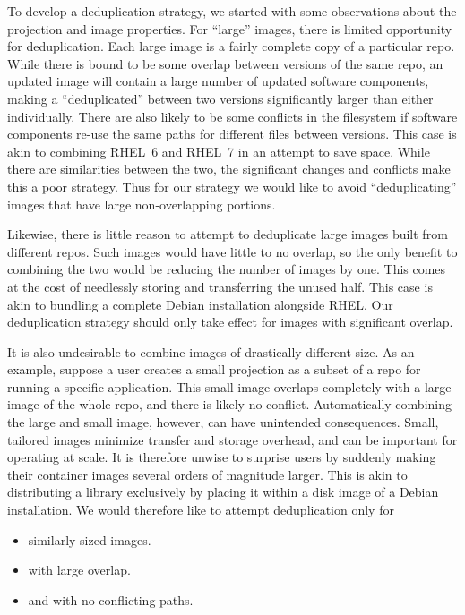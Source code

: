 \documentclass[sigconf]{acmart}
\begin{document}
To develop a deduplication strategy,
we started with some observations about the projection and image properties.
For ``large'' images,
there is limited opportunity for deduplication.
Each large image is a fairly complete copy of a particular repo.
While there is bound to be some overlap between versions of the same repo,
an updated image will contain a large number of updated software components,
making a ``deduplicated'' between two versions significantly larger than either individually.
There are also likely to be some conflicts in the filesystem if software components re-use the same paths for different files between versions.
This case is akin to combining RHEL~6 and RHEL~7 in an attempt to save space.
While there are similarities between the two,
the significant changes and conflicts make this a poor strategy.
Thus for our strategy we would like to avoid ``deduplicating'' images that have large non-overlapping portions.

Likewise, there is little reason to attempt to deduplicate large images built from different repos.
Such images would have little to no overlap,
so the only benefit to combining the two would be reducing the number of images by one.
This comes at the cost of needlessly storing and transferring the unused half.
This case is akin to bundling a complete Debian installation alongside RHEL.
Our deduplication strategy should only take effect for images with significant overlap.

It is also undesirable to combine images of drastically different size.
As an example, suppose a user creates a small projection as a subset of a repo for running a specific application.
This small image overlaps completely with a large image of the whole repo,
and there is likely no conflict.
Automatically combining the large and small image, however,
can have unintended consequences.
Small, tailored images minimize transfer and storage overhead,
and can be important for operating at scale.
It is therefore unwise to surprise users by suddenly making their container images several orders of magnitude larger.
This is akin to distributing a library exclusively by placing it within a disk image of a Debian installation.
We would therefore like to attempt deduplication only for
\begin{itemize}
\item similarly-sized images.
\item with large overlap.
\item and with no conflicting paths.
\end{itemize}
\end{document}
